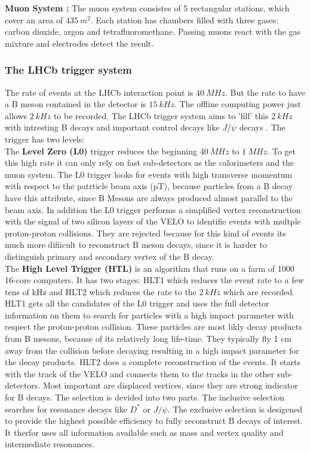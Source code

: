 \documentclass[english]{uzhpub}
\begin{document}
\textbf{Muon System \cite{bib:muonSys} :} The muon system consistes of 5 rectangular stations, which cover an area of $\SI{435}{m^2}$. Each station has chambers filled with three gases: carbon dioxide, argon and tetrafluoromethane. Passing muons react with the gas mixture and electrodes detect the result.


\subsubsection{The LHCb trigger system}
The rate of events at the LHCb interaction point is $\SI{40}{MHz}$. But the rate to have a B meson contained in the detector is $\SI{15}{kHz}$. The offline computing power just allows $\SI{2}{kHz}$ to be recorded. The LHCb trigger system aims to 'fill' this $\SI{2}{kHz}$ with intresting B decays and important control decays like $J/ \psi$ decays \cite{bib:JPsi}. The trigger has two levels: \\
The \textbf{Level Zero (L0)} trigger reduces the beginning $\SI{40}{MHz}$ to $\SI{1}{MHz}$. To get this high rate it can only rely on fast sub-detectors as the calorimeters and the muon system. The L0 trigger looks for events with high transverse momentum with respect to the patrticle beam axis (pT), because particles from a B decay have this attribute, since B Mesons are always produced almost parallel to the beam axis.
In addition the L0 trigger performs a simplified vertex reconstruction with the signal of two silicon layers of the VELO to identifie events with multple proton-proton collisions. They are rejected because for this kind of events its much more difiicult to reconstruct B meson decays, since it is harder to distinguish primary and secondary vertex of the B decay. \\
The \textbf{High Level Trigger (HTL)} is an algorithm that runs on a farm of 1000 16-core computers. It has two stages: HLT1 which reduces the event rate to a few tens of kHz and HLT2 which reduces the rate to the $\SI{2}{kHz}$ which are recorded. HLT1 gets all the candidates of the L0 trigger and uses the full detector information on them to search for particles with a high impact parameter with respect the proton-proton collision. These particles are most likly decay products from B mesons, because of its relatively long life-time. They typically fly 1 cm away from the collision before decaying resulting in a high impact parameter for the decay products. HLT2 does a complete reconstruction of the events. It starts with the track of the VELO and connects them to the tracks in the other sub-detectors. Most important are displaced vertices, since they are strong indicator for B decays. The selection is devided into two parts. The inclusive selection searches for resonance decays like $D^*$ or $J/ \psi$. The exclusive selection is desigened to provide the highest possible efficiency to fully reconstruct B decays of interest. It therfor uses all information available such as mass and vertex quality and intermediate resonances.
\end{document}
